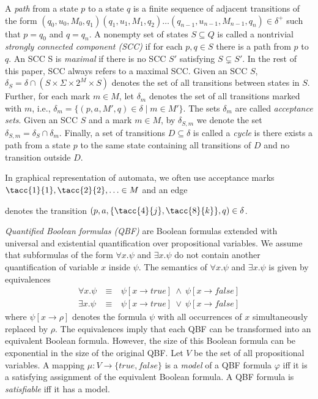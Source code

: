 \documentclass[a4paper,UKenglish,cleveref, autoref, thm-restate]{lipics-v2021}
\def\false{\mathit{false}}
\def\true{\mathit{true}}
\begin{document}
A \emph{path} from a state $p$ to a state $q$ is a finite sequence of
adjacent transitions of the form
$(q_0,u_0,M_0,q_1)(q_1,u_1,M_1,q_2)\dots(q_{n-1},u_{n-1},M_{n-1},q_n)\in\delta^+$
such that $p=q_0$ and $q=q_n$. A nonempty set of states $S\subseteq Q$
is called a nontrivial \emph{strongly connected component (SCC)} if
for each $p,q\in S$ there is a path from $p$ to $q$. An SCC S is
\emph{maximal} if there is no SCC $S'$ satisfying $S\subsetneq S'$. In
the rest of this paper, SCC always refers to a maximal SCC. Given an
SCC $S$, $\delta_S=\delta\cap (S\times \Sigma \times 2^M \times S)$
denotes the set of all transitions between states in $S$. Further, for
each mark $m\in M$, let $\delta_m$ denotes the set of all transitions
marked with $m$, i.e., $\delta_m=\{(p,a,M',q)\in\delta\mid m\in
M'\}$. The sets $\delta_m$ are called \emph{acceptance sets}.  Given
an SCC $S$ and a mark $m\in M$, by $\delta_{S,m}$ we denote the set
$\delta_{S,m}=\delta_S\cap\delta_m$. Finally, a set of transitions
$D\subseteq\delta$ is called a \emph{cycle} is there exists a path
from a state $p$ to the same state containing all transitions of $D$
and no transition outside $D$.

In graphical representation of automata, we often use acceptance marks
$\tacc{1}{1},\tacc{2}{2},\ldots\in M$ and an edge 
denotes the transition $(p,a,\{\tacc{4}{j},\tacc{8}{k}\},q)\in\delta$.

\bigskip

\emph{Quantified Boolean formulas (QBF)} are Boolean formulas
extended with universal and existential quantification over
propositional variables. We assume that subformulas of the form
$\forall x.\psi$ and $\exists x.\psi$ do not contain another
quantification of variable $x$ inside $\psi$. The semantics of
$\forall x.\psi$ and $\exists x.\psi$ is given by equivalences
\[
  \begin{array}{rcl}
    \forall x.\psi &~\equiv~& \psi[x\rightarrow\true]~\wedge~\psi[x\rightarrow\false]\\
    \exists x.\psi &~\equiv~& \psi[x\rightarrow\true]~\vee~   \psi[x\rightarrow\false]
  \end{array}
\]
where $\psi[x\rightarrow \rho]$ denotes the formula $\psi$ with all
occurrences of $x$ simultaneously replaced by $\rho$. The equivalences
imply that each QBF can be transformed into an equivalent Boolean
formula. However, the size of this Boolean formula can be exponential
in the size of the original QBF. Let $V$ be the set of all
propositional variables. A mapping $\mu:V\rightarrow\{\true,\false\}$
is a \emph{model} of a QBF formula $\varphi$ iff it is a satisfying
assignment of the equivalent Boolean formula. A QBF formula is
\emph{satisfiable} iff it has a model.
\end{document}
